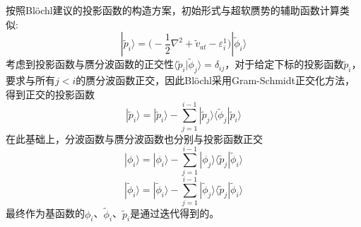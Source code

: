 按照\textrm{Bl\"ochl}建议的投影函数的构造方案，初始形式与超软赝势的辅助函数计算类似:
\begin{equation}
	|\tilde p_i\rangle=\bigg(-\dfrac12\nabla^2+\tilde v_{at}-\varepsilon_i^1\bigg)|\tilde\phi_i\rangle
	\label{eq:PAW-Blochl-21}
\end{equation}
考虑到投影函数与赝分波函数的正交性$\langle\tilde p_i|\tilde\phi_j\rangle=\delta_{ij}$，对于给定下标的投影函数$\tilde p_i$，要求与所有$j<i$的赝分波函数正交，因此\textrm{Bl\"ochl}采用\textrm{Gram-Schmidt}正交化方法，得到正交的投影函数
$$|\tilde p_i\rangle=|\tilde p_i\rangle-\sum_{j=1}^{i-1}|\tilde p_j\rangle\langle\tilde\phi_j|\tilde p_i\rangle$$
在此基础上，分波函数与赝分波函数也分别与投影函数正交
$$|\phi_i\rangle=|\phi_i\rangle-\sum\limits_{j=1}^{i-1}|\phi_j\rangle\langle\tilde p_j|\tilde\phi_i\rangle$$
$$|\tilde\phi_i\rangle=|\tilde\phi_i\rangle-\sum\limits_{j=1}^{i-1}|\tilde\phi_j\rangle\langle\tilde p_j|\tilde\phi_i\rangle$$
最终作为基函数的$\phi_i$、$\tilde\phi_i$、$\tilde p_i$是通过迭代得到的。


